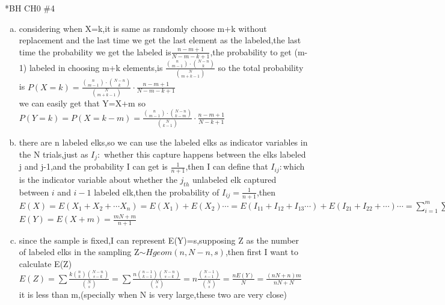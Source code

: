 \documentclass{article}
\begin{document}
\begin{homeworkProblem}*{BH CH0 \#4}
	\begin{enumerate}[(a)]
\item considering when X=k,it is same as randomly choose m+k without replacement and the last time we get the last element as the labeled,the last time the probability we get the labeled is$\frac{n-m+1}{N-m-k+1}$,the probability to get (m-1) labeled in choosing m+k elements,is $\frac{\binom{n}{m-1}\cdot\binom{N-n}{k}}{\binom{N}{m+k-1}}$
so the total probability is $P(X=k)=\frac{\binom{n}{m-1}\cdot\binom{N-n}{k}}{\binom{N}{m+k-1}}\cdot \frac{n-m+1}{N-m-k+1}$
 \\we can easily get that Y=X+m so $P(Y=k)=P(X=k-m)=\frac{\binom{n}{m-1}\cdot\binom{N-n}{k-m}}{\binom{N}{k-1}}\cdot \frac{n-m+1}{N-k+1}$
\item  there are n labeled elks,so we can use the labeled elks as indicator variables in the N trials,just as $I_j:$ whether this capture happens between the elks labeled j and j-1,and the probability I can get is $\frac{1}{n+1}$,then I can define that $I_{ij}:$which is the indicator variable about whether the $j_{th}$ unlabeled elk captured between $i$ and $i-1$ labeled elk,then the probability of $I_{ij}=\frac{1}{n+1}$,then 
$E(X)=E(X_1+X_2+\cdots X_n)=E(X_1)+E(X_2)\cdots=E(I_{11}+I_{12}+I_{13}\cdots)+E(I_{21}+I_{22}+\cdots)\cdots=\sum\limits_{i=1}^{m}\sum\limits_{j=1}^{N-n}\frac{1}{n+1}=\frac{m(N-n)}{n+1}$
$E(Y)=E(X+m)=\frac{mN+m}{n+1}$
\item	since the sample is fixed,I can represent E(Y)=s,supposing Z as the number of labeled elks in the sampling Z$\sim Hgeom(n,N-n,s)$,then first I want to calculate E(Z)
\\
$E(Z)=\sum\frac{k\binom{n}{k}\binom{N-n}{s-k}}{\binom{N}{s}}=\sum\frac{n\binom{n-1}{k-1}\binom{N-n}{s-k}}{\binom{N}{s}}=n\frac{\binom{N-1}{s-1}}{\binom{N}{s}}=\frac{nE(Y)}{N}=\frac{(nN+n)m}{nN+N}$ it is less than m,(specially when N is very large,these two are very close)  
\end{enumerate}

\end{homeworkProblem}
\end{document}
